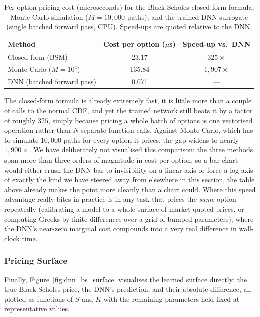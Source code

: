 \documentclass[a4paper,11pt, titlepage]{article}
\theoremstyle{definition}
\theoremstyle{plain}
\theoremstyle{remark}
\begin{document}
\begin{table}[htbp]
\centering
\caption{Per-option pricing cost (microseconds) for the Black-Scholes closed-form formula, Monte Carlo simulation ($M = 10{,}000$ paths), and the trained DNN surrogate (single batched forward pass, CPU). Speed-ups are quoted relative to the DNN.}
\label{tab:dnn_bs_benchmark}
\begin{tabular}{lcc}
\toprule
Method & Cost per option ($\mu$s) & Speed-up vs.\ DNN \\
\midrule
Closed-form (BSM) & 23.17 & $325\times$ \\
Monte Carlo ($M = 10^4$) & 135.84 & $1{,}907\times$ \\
DNN (batched forward pass) & 0.071 & --- \\
\bottomrule
\end{tabular}
\end{table}

The closed-form formula is already extremely fast, it is little more than a couple of calls to the normal CDF, and yet the trained network still beats it by a factor of roughly $325$, simply because pricing a whole batch of options is one vectorised operation rather than $N$ separate function calls. Against Monte Carlo, which has to simulate $10{,}000$ paths for every option it prices, the gap widens to nearly $1{,}900\times$. We have deliberately not visualised this comparison: the three methods span more than three orders of magnitude in cost per option, so a bar chart would either crush the DNN bar to invisibility on a linear axis or force a log axis of exactly the kind we have steered away from elsewhere in this section, the table above already makes the point more cleanly than a chart could. Where this speed advantage really bites in practice is in any task that prices the \emph{same} option repeatedly (calibrating a model to a whole surface of market-quoted prices, or computing Greeks by finite differences over a grid of bumped parameters), where the DNN's near-zero marginal cost compounds into a very real difference in wall-clock time.

\subsubsection{Pricing Surface}

Finally, Figure~\ref{fig:dnn_bs_surface} visualises the learned surface directly: the true Black-Scholes price, the DNN's prediction, and their absolute difference, all plotted as functions of $S$ and $K$ with the remaining parameters held fixed at representative values.
\end{document}

